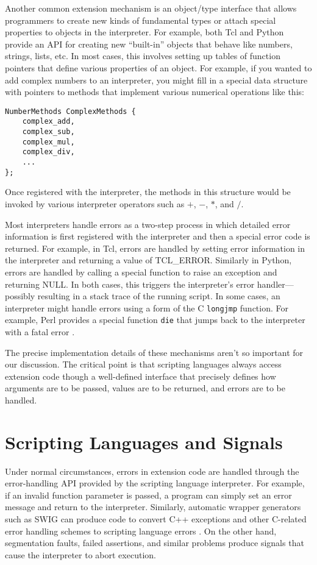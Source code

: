 Another common extension mechanism is an object/type interface that allows programmers to create new
kinds of fundamental types or attach special properties to objects in
the interpreter.  For example, both Tcl and Python provide an API for creating new 
``built-in'' objects that behave like numbers, strings, lists, etc.  
In most cases, this involves setting up tables of function
pointers that define various properties of an object.  For example, if
you wanted to add complex numbers to an interpreter, you might fill in a special
data structure with pointers to methods that implement various numerical operations like this:

\begin{verbatim}
NumberMethods ComplexMethods {
    complex_add,
    complex_sub,
    complex_mul,
    complex_div,
    ...
};\end{verbatim}

\noindent
Once registered with the interpreter, the methods in this structure
would be invoked by various interpreter operators such as $+$,
$-$, $*$, and $/$.

Most interpreters handle errors as a two-step process in which
detailed error information is first registered with the interpreter
and then a special error code is returned. For example, in Tcl, errors
are handled by setting error information in the interpreter and
returning a value of TCL\_ERROR.  Similarly in Python, errors are
handled by calling a special function to raise an exception and returning NULL.  In both cases,
this triggers the interpreter's error handler---possibly resulting in
a stack trace of the running script.  In some cases, an interpreter
might handle errors using a form of the C {\tt longjmp} function. 
For example, Perl provides a special function {\tt die} that jumps back
to the interpreter with a fatal error \cite{advperl}.

The precise implementation details of these mechanisms aren't so
important for our discussion.  The critical point is that scripting
languages always access extension code though a well-defined interface
that precisely defines how arguments are to be passed, values are to be
returned, and errors are to be handled.

\section{Scripting Languages and Signals}

Under normal circumstances, errors in extension code are handled
through the error-handling API provided by the scripting language
interpreter.  For example, if an invalid function parameter is passed,
a program can simply set an error message and return to the
interpreter.  Similarly, automatic wrapper generators such as SWIG can produce
code to convert C++ exceptions and other C-related error handling
schemes to scripting language errors \cite{swigexcept}. On the other
hand, segmentation faults, failed assertions, and similar problems
produce signals that cause the interpreter to abort execution.

